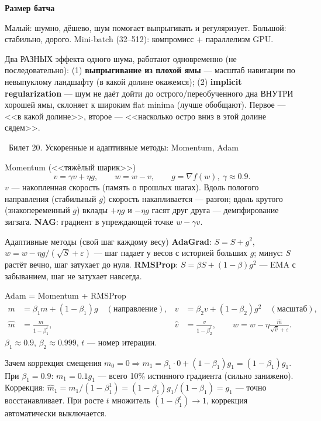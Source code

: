 \documentclass[12pt, a4paper]{article}
\newcommand{\bilet}[2]{%
  \vspace{10pt}%
  \noindent\colorbox{qcolor}{\parbox{\dimexpr\linewidth-2\fboxsep\relax}{%
    \color{white}\large\bfseries\strut\ Билет #1. #2%
  }}%
  \nopagebreak\vspace{5pt}\par\nopagebreak%
}
\newcommand{\qsub}[1]{%
  \vspace{5pt}%
  {\bfseries\color{defblue} #1}%
  \par\vspace{2pt}%
}
\newcommand{\wh}[1]{\widehat{#1}}
\begin{document}
\qsub{Размер батча}
Малый: шумно, дёшево, шум помогает выпрыгивать и регуляризует. Большой: стабильно, дорого. Mini-batch (32--512): компромисс + параллелизм GPU.

\begin{fishkabox}
Два РАЗНЫХ эффекта одного шума, работают одновременно (не последовательно): (1) \textbf{выпрыгивание из плохой ямы} --- масштаб навигации по невыпуклому ландшафту (в какой долине окажемся); (2) \textbf{implicit regularization} --- шум не даёт дойти до острого/переобученного дна ВНУТРИ хорошей ямы, склоняет к широким flat minima (лучше обобщают). Первое --- <<в какой долине>>, второе --- <<насколько остро вниз в этой долине сядем>>.
\end{fishkabox}

\bilet{20}{Ускоренные и адаптивные методы: Momentum, Adam}

\begin{defbox}{Momentum (<<тяжёлый шарик>>)}
\[
  v = \gamma v + \eta g, \qquad w = w - v, \qquad g = \nabla f(w),\ \gamma \approx 0.9.
\]
$v$ --- накопленная скорость (память о прошлых шагах). Вдоль пологого направления (стабильный $g$) скорость накапливается --- разгон; вдоль крутого (знакопеременный $g$) вклады $+\eta g$ и $-\eta g$ гасят друг друга --- демпфирование зигзага. \textbf{NAG}: градиент в упреждающей точке $w - \gamma v$.
\end{defbox}

\begin{defbox}{Адаптивные методы (свой шаг каждому весу)}
\textbf{AdaGrad}: $S = S + g^2$, $w = w - \eta g/(\sqrt{S} + \varepsilon)$ --- шаг падает у весов с историей больших $g$; минус: $S$ растёт вечно, шаг затухает до нуля. \textbf{RMSProp}: $S = \beta S + (1-\beta)g^2$ --- EMA с забыванием, шаг не затухает навсегда.
\end{defbox}

\begin{defbox}{Adam = Momentum + RMSProp}
\begin{align*}
  m &= \beta_1 m + (1-\beta_1)g \quad(\text{направление}), & v &= \beta_2 v + (1-\beta_2)g^2 \quad(\text{масштаб}),\\
  \wh m &= \frac{m}{1 - \beta_1^t}, & \wh v &= \frac{v}{1 - \beta_2^t}, \qquad w = w - \eta\frac{\wh m}{\sqrt{\wh v} + \varepsilon}.
\end{align*}
$\beta_1 \approx 0.9$, $\beta_2 \approx 0.999$, $t$ --- номер итерации.
\end{defbox}

\begin{proofbox}{Зачем коррекция смещения}
$m_0 = 0 \Rightarrow m_1 = \beta_1\cdot 0 + (1-\beta_1)g_1 = (1-\beta_1)g_1$. При $\beta_1 = 0.9$: $m_1 = 0.1 g_1$ --- всего 10\% истинного градиента (сильно занижено). Коррекция: $\wh m_1 = m_1/(1 - \beta_1^1) = (1-\beta_1)g_1/(1-\beta_1) = g_1$ --- точно восстанавливает. При росте $t$ множитель $(1-\beta_1^t) \to 1$, коррекция автоматически выключается.
\end{proofbox}
\end{document}

